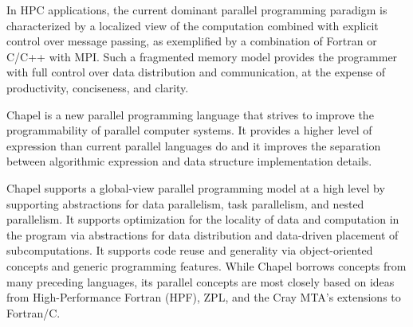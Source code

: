 In HPC applications, the current dominant parallel programming paradigm 
is characterized by a localized
view of the computation combined with explicit control
over message passing, as exemplified by a combination
of Fortran or C/C++ with MPI. Such a fragmented memory
model provides the programmer with full control over data
distribution and communication, at the expense of productivity,
conciseness, and clarity.

Chapel is a new parallel programming language that 
strives to improve the programmability of parallel computer systems.
It provides a higher level of expression 
than current parallel languages do and it improves the separation between 
algorithmic expression and data structure implementation details. 

Chapel supports a global-view parallel programming model at a high level by 
supporting abstractions for data parallelism, task parallelism, and nested parallelism. 
It supports optimization for the locality of data and computation in the program 
via abstractions for data distribution and data-driven placement of subcomputations. 
It supports code reuse and generality via object-oriented concepts and generic 
programming features. While Chapel borrows concepts from many preceding languages, 
its parallel concepts are most closely based on ideas from High-Performance Fortran 
(HPF), ZPL, and the Cray MTA's extensions to Fortran/C. 

